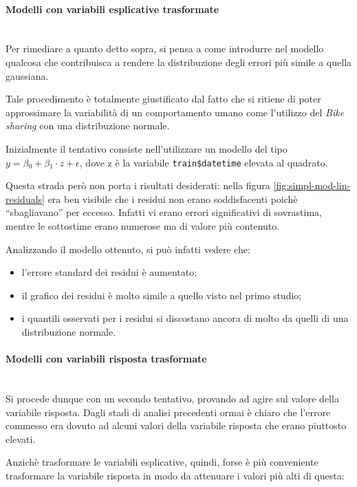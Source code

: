 \paragraph{Modelli con variabili esplicative trasformate} \mbox{}\\
Per rimediare a quanto detto sopra, si pensa a come introdurre nel modello
qualcosa che contribuisca a rendere la distribuzione degli errori più simile
a quella gaussiana.

Tale procedimento è totalmente giustificato dal fatto che si ritiene di poter
approssimare la variabilità di un comportamento umano come l'utilizzo del
\emph{Bike sharing} con una distribuzione normale.

Inizialmente il tentativo consiste nell'utilizzare un modello del tipo
$ y = \beta{}_0 + \beta{}_1 \cdot{} z + \epsilon{} $, dove z è la variabile
\texttt{train\$datetime} elevata al quadrato.

Questa strada però non porta i risultati desiderati: nella figura
\ref{fig:simpl-mod-lin-residuals} era ben visibile che i residui non erano
soddisfacenti poichè ``sbagliavano'' per eccesso. Infatti vi erano errori
significativi di sovrastima, mentre le sottostime erano numerose ma di valore
più contenuto.

Analizzando il modello ottenuto, si può infatti vedere che:

\begin{itemize}
\item l'errore standard dei residui è aumentato;
\item il grafico dei residui è molto simile a quello visto nel primo studio;
\item i quantili osservati per i residui si discostano ancora di molto da
  quelli di una distribuzione normale.
\end{itemize}

\paragraph{Modelli con variabili risposta trasformate} \mbox{}\\
Si procede dunque con un secondo tentativo, provando ad agire sul valore della
variabile risposta. Dagli stadi di analisi precedenti ormai è chiaro che
l'errore commesso era dovuto ad alcuni valori della variabile risposta che
erano piuttosto elevati.

Anzichè trasformare le variabili esplicative, quindi, forse è più conveniente
trasformare la variabile risposta in modo da attenuare i valori più alti di
questa:

